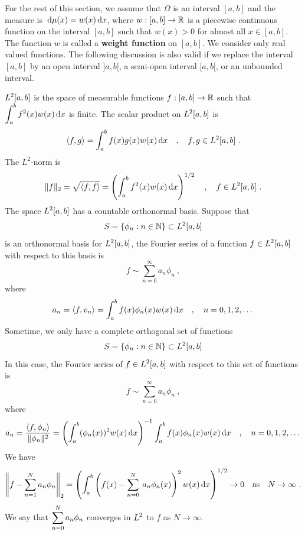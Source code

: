 For the rest of this section, we assume that $\Omega$ is an interval
$[a,b]$ and the measure is $\,\mathrm{d}\mu(x) = w(x) \,\mathrm{d}x$, where
$w:[a,b]\rightarrow \mathbb{R}$ is a
piecewise continuous function on the interval $[a,b]$ such that
$w(x) > 0$ for almost all $x \in [a,b]$.  The function $w$ is called a
{\bfseries weight function} on
$[a,b]$.  We consider only real valued functions.  The following
discussion is also valid if we replace the interval $[a,b]$ by an open
interval $]a,b[$, a semi-open interval $[a,b[$, or an unbounded interval.

$\displaystyle L^2[a,b]$ is the space of measurable functions
$f:[a,b]\rightarrow \mathbb{R}$ such
that $\displaystyle \int_a^b f^2(x) w(x) \,\mathrm{d}x$ is finite.  The scalar
product on $\displaystyle L^2[a,b]$ is
\begin{equation} \label{appr_scp}
\left\langle{f} , {g}\right\rangle = \int_a^b f(x) g(x) w(x) \,\mathrm{d}x \quad , \quad f, g \in L^2[a,b] \ .
\end{equation}
The $L^2$-norm is
\begin{equation} \label{appr_norm}
\| f \|_2 = \sqrt{\left\langle{f} , {f}\right\rangle} = \left(\int_a^b f^2(x) w(x) \,\mathrm{d}x\right)^{1/2}
\quad , \quad f \in L^2[a,b] \ .
\end{equation}
The space $\displaystyle L^2[a,b]$ has a countable orthonormal basis.
Suppose that
\[
S = \{\phi_n : n \in \mathbb{N} \} \subset L^2[a,b]
\]
is an orthonormal basis for $\displaystyle L^2[a,b]$, the Fourier
series of a function $\displaystyle f \in L^2[a,b]$ with respect to
this basis is
\[
f \sim \sum_{n=0}^{\infty} a_{n} \phi_n \  ,
\]
where
\[
a_n = \left\langle{f} , {v_n}\right\rangle = \int_a^b f(x) \phi_n(x) w(x) \,\mathrm{d}x
\quad, \quad n = 0, 1, 2, \dots
\]
Sometime, we only have a complete orthogonal set of functions
\[
S = \{\phi_n : n \in \mathbb{N} \} \subset L^2[a,b]
\]
In this case, the Fourier series of $\displaystyle f \in L^2[a,b]$
with respect to this set of functions is
\[
f \sim \sum_{n=0}^{\infty} a_{n} \phi_n \  ,
\]
where
\[
a_n = \frac{\left\langle{f} , {\phi_n}\right\rangle}{\| \phi_n \|^2}
= \left( \int_a^b (\phi_n(x))^2 w(x) \,\mathrm{d}x \right)^{-1}
\int_a^b f(x) \phi_n(x) w(x) \,\mathrm{d}x
\quad, \quad n = 0, 1, 2, \dots
\]
We have
\[
\left\| f - \sum_{n=1}^{N} a_n \phi_n \right\|_2
= \left( \int_a^b \left( f(x) - \sum_{n=0}^{N} \: a_n \phi_n(x) \right)^2
w(x) \,\mathrm{d}x \right)^{1/2} \rightarrow 0 \quad \text{as} \quad
N \rightarrow \infty \ .
\]
We say that $\displaystyle \sum_{n=0}^{N} a_n \phi_n$ converges in
$\displaystyle L^2$ to $f$ as $N\rightarrow \infty$.


